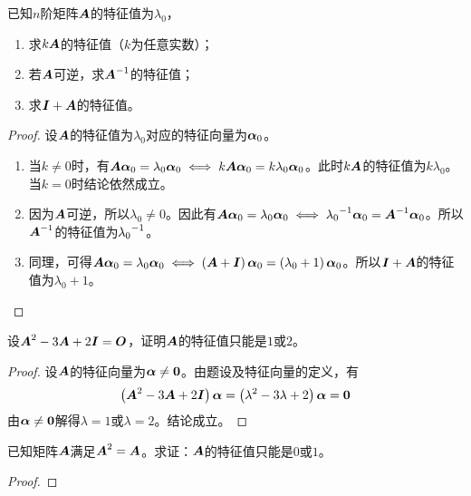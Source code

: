 \begin{problem}
已知\(n\)阶矩阵\(\boldsymbol{A}\)的特征值为\(\lambda_0\)，
\begin{enumerate}
    \item 求\(k\boldsymbol{A}\)的特征值（\(k\)为任意实数）；
    \item 若\(\boldsymbol{A}\)可逆，求\({\boldsymbol{A}}^{-1}\)的特征值；
    \item 求\(\boldsymbol{I}+\boldsymbol{A}\)的特征值。
\end{enumerate}
\end{problem}
\begin{proof}
    设\(\boldsymbol{A}\)的特征值为\(\lambda_0\)对应的特征向量为\(\boldsymbol{\alpha}_0\)。
    \begin{enumerate}
        \item 当\(k\neq0\)时，有\(\boldsymbol{A}\boldsymbol{\alpha}_0=\lambda_0\boldsymbol{\alpha}_0\iff k\boldsymbol{A}\boldsymbol{\alpha}_0=k\lambda_0\boldsymbol{\alpha}_0\)。此时\(k\boldsymbol{A}\)的特征值为\(k\lambda_0\)。当\(k=0\)时结论依然成立。
        \item 因为\(\boldsymbol{A}\)可逆，所以\(\lambda_0\neq0\)。因此有\(\boldsymbol{A}\boldsymbol{\alpha}_0=\lambda_0\boldsymbol{\alpha}_0\iff{\lambda_0}^{-1}\boldsymbol{\alpha}_0={\boldsymbol{A}}^{-1}\boldsymbol{\alpha}_0\)。所以\({\boldsymbol{A}}^{-1}\)的特征值为\({\lambda_0}^{-1}\)。
        \item 同理，可得\(\boldsymbol{A}\boldsymbol{\alpha}_0=\lambda_0\boldsymbol{\alpha}_0\iff\left( \boldsymbol{A}+\boldsymbol{I} \right)\boldsymbol{\alpha}_0=\left( \lambda_0+1 \right)\boldsymbol{\alpha}_0\)。所以\(\boldsymbol{I}+\boldsymbol{A}\)的特征值为\(\lambda_0+1\)。
    \end{enumerate}
\end{proof}

\begin{problem}
设\(\boldsymbol{A}^2-3\boldsymbol{A}+2\boldsymbol{I}=\boldsymbol{O}\)，证明\(\boldsymbol{A}\)的特征值只能是\(1\)或\(2\)。
\end{problem}
\begin{proof}
    设\(\boldsymbol{A}\)的特征向量为\(\boldsymbol{\alpha}\neq\boldsymbol{0}\)。由题设及特征向量的定义，有
    \begin{equation*}
        \left( \boldsymbol{A}^2-3\boldsymbol{A}+2\boldsymbol{I} \right)\boldsymbol{\alpha}=\left( \lambda^2-3\lambda+2 \right)\boldsymbol{\alpha}=\boldsymbol{0}
    \end{equation*}
    由\(\boldsymbol{\alpha}\neq\boldsymbol{0}\)解得\(\lambda=1\)或\(\lambda=2\)。结论成立。
\end{proof}

\begin{problem}
已知矩阵\(\boldsymbol{A}\)满足\(\boldsymbol{A}^2=\boldsymbol{A}\)。求证：\(\boldsymbol{A}\)的特征值只能是\(0\)或\(1\)。
\end{problem}
\begin{proof}
\end{proof}

